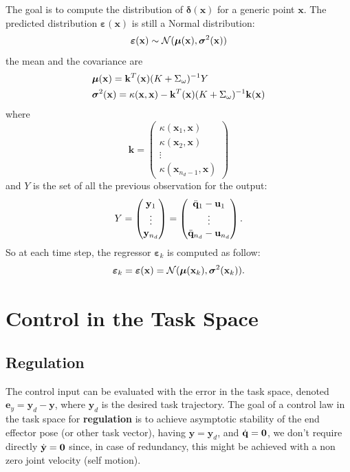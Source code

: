 \documentclass[10pt, a4paper]{report}
\newcommand{\y}{{\mathbf y}}
\begin{document}
The goal is to compute the distribution of $\boldsymbol{\delta}(\mathbf x)$ for a generic point $\mathbf x$. The predicted distribution $\boldsymbol{\varepsilon}(\mathbf x)$ is still a Normal distribution:\begin{equation}
    \boldsymbol{\varepsilon}(\mathbf x)\sim\mathcal N({\boldsymbol{\mu}}(\mathbf x),{\boldsymbol{\sigma}}^2(\mathbf x))
\end{equation}
the mean and the covariance are\begin{align}
    &{\boldsymbol{\mu}}(\mathbf x)=\mathbf k^T(\mathbf x)(K+\Sigma_\omega)^{-1}Y\\ 
    &{\boldsymbol{\sigma}}^2(\mathbf x)=\kappa(\mathbf x,\mathbf x)-\mathbf k^T(\mathbf x)(K+\Sigma_\omega)^{-1}\mathbf k(\mathbf x)
\end{align}
where\begin{equation}
        \mathbf k=\begin{pmatrix}
            \kappa(\mathbf x_1,\mathbf x)\\ 
            \kappa(\mathbf x_2,\mathbf x)\\\vdots \\ 
            \kappa(\mathbf x_{n_d-1},\mathbf x)
        \end{pmatrix}
    \end{equation}
and $Y$ is the set of all the previous observation for the output:\begin{equation}
    Y=\begin{pmatrix}
        \y_1\\ \vdots \\ \y_{n_d}
    \end{pmatrix}=\begin{pmatrix}
        \ddq_1-\mathbf u_1\\ \vdots \\ \ddq_{n_d}-\mathbf u_{n_d}
    \end{pmatrix}.
\end{equation}
 So at each time step, the regressor $\boldsymbol{\varepsilon}_k$ is computed as follow:\begin{equation}
    \boldsymbol{\varepsilon}_k=\boldsymbol{\varepsilon}(\mathbf x)=\mathcal N({\boldsymbol{\mu}}(\mathbf x_k),{\boldsymbol{\sigma}}^2(\mathbf x_k)).
 \end{equation}
\section{Control in the Task Space}
\subsection{Regulation}
The control input can be evaluated with the error in the task space, denoted $\mathbf e_y=\y_d-\y$, where $\y_d$ is the desired task trajectory. The goal of a control law in the task space for \textbf{regulation} is to achieve asymptotic stability of the end effector pose (or other task vector), having $\y=\y_d$, and ${\dot{\mathbf q}}=\mathbf 0$, we don't require directly ${\dot{\mathbf y}}=\mathbf 0$ since, in case of redundancy, this might be achieved with a non zero joint velocity (self motion).\bigskip 
\end{document}
